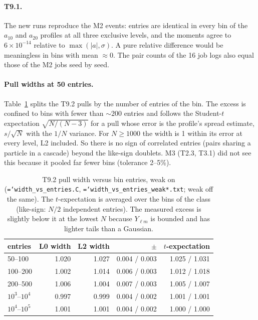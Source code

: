 \documentclass[11pt,a4paper]{article}
\newcommand{\code}[1]{\texttt{\hyphenchar\font=`\-#1}}
\begin{document}
\paragraph{T9.1.} The new runs reproduce the M2 events: entries are identical in every bin of the
$a_{10}$ and $a_{20}$ profiles at all three exclusive levels, and the moments agree to $6\times10^{-14}$
relative to $\max(|a|,\sigma)$. A pure relative difference would be meaningless in bins with mean
$\approx0$. The pair counts of the 16 job logs also equal those of the M2 jobs seed by seed.

\paragraph{Pull widths at 50 entries.} Table~\ref{tab:width} splits the T9.2 pulls by the
number of entries of the bin. The excess is confined to bins with fewer than $\sim200$ entries and
follows the Student-$t$ expectation $\sqrt{N/(N-3)}$ for a pull whose error is the profile's
spread estimate, $s/\sqrt N$ with the $1/N$ variance. For $N\ge1000$ the width is 1 within its
error at every level, L2 included. So there is no sign of correlated entries (pairs sharing a
particle in a cascade) beyond the like-sign doublets. M3 (T2.3, T3.1) did not see this because it
pooled far fewer bins (tolerance 2--5\%).

\begin{table}[H]
\centering
\small
\begin{tabular}{lrrrr}
\toprule
entries & L0 width & L2 width & $\pm$ & $t$-expectation \\
\midrule
50--100 & 1.020 & 1.027 & 0.004 / 0.003 & 1.025 / 1.031 \\
100--200 & 1.002 & 1.014 & 0.006 / 0.003 & 1.012 / 1.018 \\
200--500 & 1.006 & 1.004 & 0.007 / 0.003 & 1.005 / 1.007 \\
$10^3$--$10^4$ & 0.997 & 0.999 & 0.004 / 0.002 & 1.001 / 1.001 \\
$10^4$--$10^5$ & 1.001 & 1.001 & 0.004 / 0.002 & 1.000 / 1.000 \\
\bottomrule
\end{tabular}
\caption{T9.2 pull width versus bin entries, weak on (\code{width\_vs\_entries.C},
\code{width\_vs\_entries\_weak*.txt}; weak off the same). The $t$-expectation is averaged over the
bins of the class (like-sign: $N/2$ independent entries). The measured excess is slightly below it
at the lowest $N$ because $Y_{\ell m}$ is bounded and has lighter tails than a Gaussian.}
\label{tab:width}
\end{table}
\end{document}
